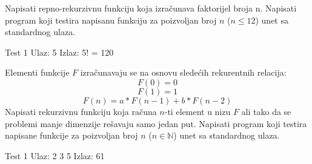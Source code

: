 \begin{Exercise}[label=105]
  Napisati repno-rekurzivnu funkciju koja izračunava faktorijel broja n. Napisati program koji testira napisanu funkciju za poizvoljan broj $n$ ($n \le 12$) unet sa standardnog ulaza.
  
\begin{minitest}
\begin{test}{Test 1}
Ulaz:   5
Izlaz:  5! = 120
\end{test}
\end{minitest}

\end{Exercise}
\begin{Answer}[ref=105]
\end{Answer}


\begin{Exercise}[label=106]
Elementi funkcije $F$ izračunavaju se na osnovu sledećih rekurentnih relacija:
 $$F(0) = 0$$
 $$F(1) = 1$$
 $$F(n) = a* F(n-1) + b*F(n-2)$$
Napisati rekurzivnu funkciju  koja računa $n$-ti element u nizu $F$ ali tako da se problemi manje dimenzije rešavaju samo jedan put.
Napisati program koji testira napisane funkcije za poizvoljan broj $n$ ($n \in \mathbb N$) unet sa standardnog ulaza.
  
\begin{minitest}
\begin{test}{Test 1}
Ulaz:   2 3 5
Izlaz:  61
\end{test}
\end{minitest}

\end{Exercise}
\begin{Answer}[ref=106]
\end{Answer}

